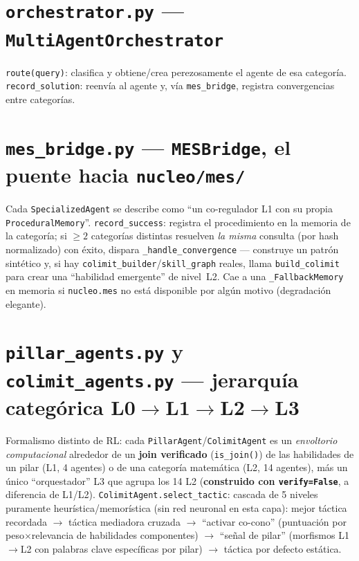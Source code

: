 \documentclass[11pt,a4paper]{report}
\newcommand{\code}[1]{\texttt{#1}}
\begin{document}
\section{\code{orchestrator.py} --- \code{MultiAgentOrchestrator}}

\code{route(query)}: clasifica y obtiene/crea perezosamente el agente de esa categor\'ia. \code{record_solution}: reenv\'ia al agente y, v\'ia \code{mes\_bridge}, registra convergencias entre categor\'ias.

\section{\code{mes_bridge.py} --- \code{MESBridge}, el puente hacia \code{nucleo/mes/}}

Cada \code{SpecializedAgent} se describe como ``un co-regulador L1 con su propia \code{ProceduralMemory}''. \code{record_success}: registra el procedimiento en la memoria de la categor\'ia; si $\ge2$ categor\'ias distintas resuelven \emph{la misma} consulta (por hash normalizado) con \'exito, dispara \code{\_handle_convergence} --- construye un patr\'on sint\'etico y, si hay \code{colimit_builder}/\code{skill_graph} reales, llama \code{build_colimit} para crear una ``habilidad emergente'' de nivel~L2. Cae a una \code{\_FallbackMemory} en memoria si \code{nucleo.mes} no est\'a disponible por alg\'un motivo (degradaci\'on elegante).

\section{\code{pillar_agents.py} y \code{colimit_agents.py} --- jerarqu\'ia categ\'orica L0$\to$L1$\to$L2$\to$L3}

Formalismo distinto de RL: cada \code{PillarAgent}/\code{ColimitAgent} es un \emph{envoltorio computacional} alrededor de un \textbf{join verificado} (\code{is_join()}) de las habilidades de un pilar (L1, 4 agentes) o de una categor\'ia matem\'atica (L2, 14 agentes), m\'as un \'unico ``orquestador'' L3 que agrupa los 14 L2 (\textbf{construido con \code{verify=False}}, a diferencia de L1/L2). \code{ColimitAgent.select_tactic}: cascada de 5 niveles puramente heur\'istica/memor\'istica (sin red neuronal en esta capa): mejor t\'actica recordada $\to$ t\'actica mediadora cruzada $\to$ ``activar co-cono'' (puntuaci\'on por peso$\times$relevancia de habilidades componentes) $\to$ ``se\~nal de pilar'' (morfismos L1$\to$L2 con palabras clave espec\'ificas por pilar) $\to$ t\'actica por defecto est\'atica.
\end{document}
